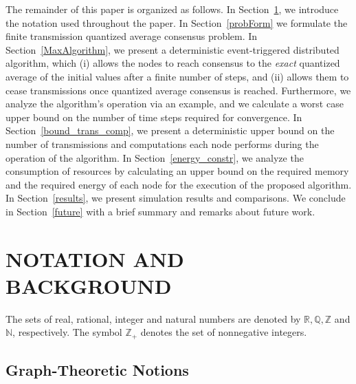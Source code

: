 \documentclass[twocolumn]{autart}    %
\let\mathbb=\mathds %
\begin{document}
The remainder of this paper is organized as follows. 
In Section~\ref{preliminaries}, we introduce the notation used throughout the paper.
In Section~\ref{probForm} we formulate the finite transmission quantized average consensus problem. 
In Section~\ref{MaxAlgorithm}, we present a deterministic event-triggered distributed algorithm, which (i) allows the nodes to reach consensus to the \textit{exact} quantized average of the initial values after a finite number of steps, and (ii) allows them to cease transmissions once quantized average consensus is reached. 
Furthermore, we analyze the algorithm's operation via an example, and we calculate a worst case upper bound on the number of time steps required for convergence.  
In Section~\ref{bound_trans_comp}, we present a deterministic upper bound on the number of transmissions and computations each node performs during the operation of the algorithm. 
In Section~\ref{energy_constr}, we analyze the consumption of resources by calculating an upper bound on the required memory and the required energy of each node for the execution of the proposed algorithm. 
In Section~\ref{results}, we present simulation results and comparisons. 
We conclude in Section~\ref{future} with a brief summary and remarks about future work.


%
%
%
%
\section{NOTATION AND BACKGROUND}\label{preliminaries}

The sets of real, rational, integer and natural numbers are denoted by $ \mathbb{R}, \mathbb{Q}, \mathbb{Z}$ and $\mathbb{N}$, respectively. 
The symbol $\mathbb{Z}_+$ denotes the set of nonnegative integers. 


\subsection{Graph-Theoretic Notions}
\end{document}
